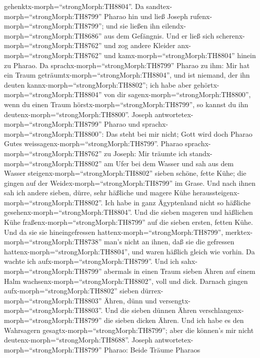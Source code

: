gehenktx-morph=``strongMorph:TH8804''.  Da
sandtex-morph=``strongMorph:TH8799'' Pharao hin und ließ Joseph
rufenx-morph=``strongMorph:TH8799''; und sie ließen ihn
eilendx-morph=``strongMorph:TH8686'' aus dem Gefängnis. Und er ließ sich
scherenx-morph=``strongMorph:TH8762'' und zog andere Kleider
anx-morph=``strongMorph:TH8762'' und kamx-morph=``strongMorph:TH8804''
hinein zu Pharao.  Da sprachx-morph=``strongMorph:TH8799''
Pharao zu ihm: Mir hat ein Traum geträumtx-morph=``strongMorph:TH8804'',
und ist niemand, der ihn deuten kannx-morph=``strongMorph:TH8802''; ich
habe aber gehörtx-morph=``strongMorph:TH8804'' von dir
sagenx-morph=``strongMorph:TH8800'', wenn du einen Traum
hörstx-morph=``strongMorph:TH8799'', so kannst du ihn
deutenx-morph=``strongMorph:TH8800''.  Joseph
antwortetex-morph=``strongMorph:TH8799'' Pharao und
sprachx-morph=``strongMorph:TH8800'': Das steht bei mir nicht; Gott wird
doch Pharao Gutes weissagenx-morph=``strongMorph:TH8799''. 
Pharao sprachx-morph=``strongMorph:TH8762'' zu Joseph: Mir träumte ich
standx-morph=``strongMorph:TH8802'' am Ufer bei dem Wasser 
und sah aus dem Wasser steigenx-morph=``strongMorph:TH8802'' sieben
schöne, fette Kühe; die gingen auf der
Weidex-morph=``strongMorph:TH8799'' im Grase.  Und nach
ihnen sah ich andere sieben, dürre, sehr häßliche und magere Kühe
heraussteigenx-morph=``strongMorph:TH8802''. Ich habe in ganz
Ägyptenland nicht so häßliche gesehenx-morph=``strongMorph:TH8804''.
 Und die sieben mageren und häßlichen Kühe
fraßenx-morph=``strongMorph:TH8799'' auf die sieben ersten, fetten Kühe.
 Und da sie sie hineingefressen
hattenx-morph=``strongMorph:TH8799'',
merktex-morph=``strongMorph:TH8738'' man's nicht an ihnen, daß sie die
gefressen hattenx-morph=``strongMorph:TH8804'', und waren häßlich gleich
wie vorhin. Da wachte ich aufx-morph=``strongMorph:TH8799''.
 Und ich sahx-morph=``strongMorph:TH8799'' abermals in
einen Traum sieben Ähren auf einem Halm
wachsenx-morph=``strongMorph:TH8802'', voll und dick. 
Darnach gingen aufx-morph=``strongMorph:TH8802'' sieben
dürrex-morph=``strongMorph:TH8803'' Ähren, dünn und
versengtx-morph=``strongMorph:TH8803''.  Und die sieben
dünnen Ähren verschlangenx-morph=``strongMorph:TH8799'' die sieben
dicken Ähren. Und ich habe es den Wahrsagern
gesagtx-morph=``strongMorph:TH8799''; aber die können's mir nicht
deutenx-morph=``strongMorph:TH8688''.  Joseph
antwortetex-morph=``strongMorph:TH8799'' Pharao: Beide Träume Pharaos
